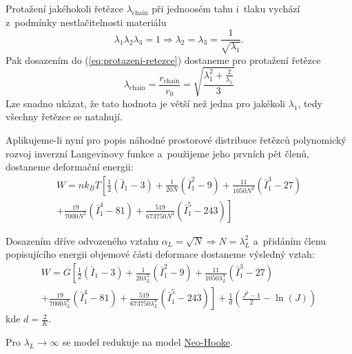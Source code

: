 Protažení jakéhokoli řetězce $\lambda_\text{chain}$ při jednoosém tahu i~tlaku vychází z~podmínky nestlačitelnosti materiálu
\begin{equation}
	\lambda_1 \lambda_2 \lambda_3 = 1 \Rightarrow \lambda_2 = \lambda_3 = \frac{1}{\sqrt{\lambda_1}}.
\end{equation}
Pak dosazením do (\ref{eq:protazeni-retezce}) dostaneme pro protažení řetězce 
\begin{equation}
	\lambda_\text{chain} = \frac{r_\text{chain}}{r_0} = \sqrt{\frac{\lambda_1^2 + \frac{2}{\lambda_1}}{3}}
\end{equation}
Lze snadno ukázat, že tato hodnota je větší než jedna pro jakékoli $\lambda_1$, tedy všechny řetězce se natahují.

Aplikujeme-li nyní pro popis náhodné prostorové distribuce řetězců polynomický rozvoj inverzní Langevinovy funkce a~použijeme jeho prvních pět členů, dostaneme deformační energii:
\begin{multline}
	W
	= n k_B T \left[ \frac{1}{2} (\bar{I}_1-3) + \frac{1}{20 N} (\bar{I}_1^2-9) + \frac{11}{1050 N^2} (\bar{I}_1^3-27) \right.\\
	\left. + \frac{19}{7000 N^3} (\bar{I}_1^4-81) + \frac{519}{673750 N^4} (\bar{I}_1^5-243) \right]
\end{multline}

Dosazením dříve odvozeného vztahu $\alpha_L = \sqrt{N} \Rightarrow N = \lambda_L^2$ a~přidáním členu popisujícího energii objemové části deformace dostaneme výsledný vztah:
\begin{multline}
	W
	= G \left[ \frac{1}{2} (\bar{I}_1-3) + \frac{1}{20 \lambda_L^2} (\bar{I}_1^2-9) + \frac{11}{1050 \lambda_L^4} (\bar{I}_1^3-27) \right.\\
	\left. + \frac{19}{7000 \lambda_L^6} (\bar{I}_1^4-81) + \frac{519}{673750 \lambda_L^8} (\bar{I}_1^5-243) \right]
	+ \frac{1}{d} \left(\frac{J^2 - 1}{2} - \ln(J)\right)
\end{multline}
kde $d=\frac{2}{K}$.

Pro $\lambda_L \rightarrow \infty$ se model redukuje na model \hyperref[sec:neo-hooke]{Neo-Hooke}.

